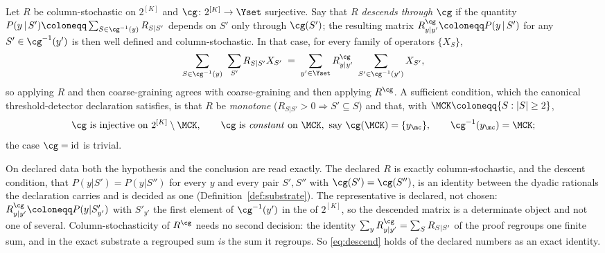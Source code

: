 \begin{lemma}
\label{lem:descent}
Let $R$ be column-stochastic on $2^{[K]}$ and $\cg\colon2^{[K]}\to\Yset$
surjective. Say that \emph{$R$ descends through $\cg$} if the quantity
$P(y\,|\,S')\coloneqq\sum_{S\in\cg^{-1}(y)}R_{S|S'}$ depends on $S'$ only
through $\cg(S')$; the resulting matrix
$R^{\cg}_{y|y'}\coloneqq P(y\,|\,S')$ for any $S'\in\cg^{-1}(y')$ is then well
defined and column-stochastic. In that case, for every family of operators
$\{X_{S}\}$,
\begin{equation}\label{eq:descend}
  \sum_{S\in\cg^{-1}(y)}\ \sum_{S'}R_{S|S'}X_{S'}
  \;=\;\sum_{y'\in\Yset}R^{\cg}_{y|y'}\ \sum_{S'\in\cg^{-1}(y')}X_{S'},
\end{equation}
so applying $R$ and then coarse-graining agrees with coarse-graining and then
applying $R^{\cg}$. A sufficient condition, which the canonical
threshold-detector declaration satisfies, is that $R$ be \emph{monotone}
($R_{S|S'}>0\Rightarrow S'\subseteq S$) and that, with
$\MCK\coloneqq\{S:|S|\ge2\}$,
\begin{equation}\label{eq:canonicalcg}
  \cg\ \text{is injective on }2^{[K]}\setminus\MCK,
  \qquad
  \cg\ \text{is \emph{constant} on }\MCK,\ \text{say }\cg(\MCK)=\{y_{\mc}\},
  \qquad
  \cg^{-1}(y_{\mc})=\MCK ;
\end{equation}
the case $\cg=\mathrm{id}$ is trivial.

On declared data both the hypothesis and the conclusion are read exactly. The
declared $R$ is exactly column-stochastic, and the descent
condition, that $P(y|S')=P(y|S'')$ for every $y$ and every pair $S',S''$ with
$\cg(S')=\cg(S'')$, is an identity between the dyadic rationals the
declaration carries and is decided as one
(Definition~\ref{def:substrate}).
The representative is declared, not chosen:
$R^{\cg}_{y|y'}\coloneqq P(y|S'_{y'})$ with $S'_{y'}$ the first element of
$\cg^{-1}(y')$ in the  of $2^{[K]}$, so the descended
matrix is a determinate object and not one of several. Column-stochasticity of
$R^{\cg}$ needs no second decision: the identity
$\sum_yR^{\cg}_{y|y'}=\sum_SR_{S|S'}$ of the proof regroups one finite sum,
and in the exact substrate a regrouped sum \emph{is} the sum it regroups. So \eqref{eq:descend} holds of the declared
numbers as an exact identity.
\end{lemma}

